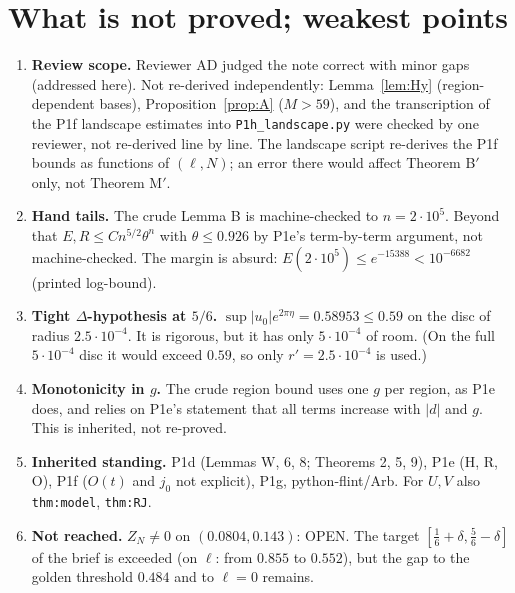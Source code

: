 \documentclass[11pt]{article}
\theoremstyle{remark}\newtheorem{remark}[theorem]{Remark}
\begin{document}
\section{What is not proved; weakest points}
\begin{enumerate}
\item \textbf{Review scope.} Reviewer AD judged the note correct with minor gaps (addressed here). Not re-derived independently: Lemma~\ref{lem:Hy} (region-dependent bases), Proposition~\ref{prop:A} ($M>59$), and the transcription of the P1f landscape estimates into \texttt{P1h\_landscape.py} were checked by one reviewer, not re-derived line by line. The landscape script re-derives the P1f bounds as functions of $(\ell,N)$; an error there would affect Theorem B$'$ only, not Theorem M$'$.
\item \textbf{Hand tails.} The crude Lemma B is machine-checked to $n=2\cdot10^5$. Beyond that $E,R\le Cn^{5/2}\theta^n$ with $\theta\le0.926$ by P1e's term-by-term argument, not machine-checked. The margin is absurd: $E(2\cdot10^5)\le e^{-15388}<10^{-6682}$ (printed log-bound).
\item \textbf{Tight $\Delta$-hypothesis at $5/6$.} $\sup|u_0|e^{2\pi\eta}=0.58953\le0.59$ on the disc of radius $2.5\cdot10^{-4}$. It is rigorous, but it has only $5\cdot10^{-4}$ of room. (On the full $5\cdot10^{-4}$ disc it would exceed $0.59$, so only $r'=2.5\cdot10^{-4}$ is used.)
\item \textbf{Monotonicity in $g$.} The crude region bound uses one $g$ per region, as P1e does, and relies on P1e's statement that all terms increase with $|d|$ and $g$. This is inherited, not re-proved.
\item \textbf{Inherited standing.} P1d (Lemmas W, 6, 8; Theorems 2, 5, 9), P1e (H, R, O), P1f ($O(t)$ and $j_0$ not explicit), P1g, python-flint/Arb. For $U,V$ also \texttt{thm:model}, \texttt{thm:RJ}.
\item \textbf{Not reached.} $Z_N\ne0$ on $(0.0804,0.143)$: OPEN. The target $[\frac16+\delta,\frac56-\delta]$ of the brief is exceeded (on $\ell$: from $0.855$ to $0.552$), but the gap to the golden threshold $0.484$ and to $\ell=0$ remains.
\end{enumerate}
\end{document}
